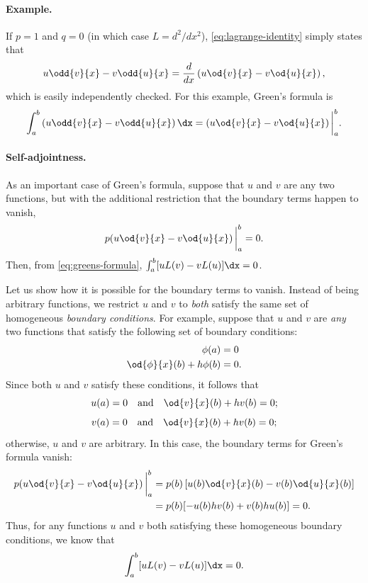 \paragraph{Example.}
If $p = 1$ and $q = 0$ (in which case $L = d^2/dx^2$), \eqref{eq:lagrange-identity} simply states that
\[
u\odd{v}{x} - v\odd{u}{x} = \frac{d}{d x}\left(u\od{v}{x} - v\od{u}{x}\right),
\]
which is easily independently checked.  For this example, Green's formula is
\[
\int_a^b \left(u\odd{v}{x} - v\odd{u}{x}\right)\dx = \left(u\od{v}{x} - v\od{u}{x}\right)\bigg|_a^b.
\]

\paragraph{Self-adjointness.}
As an important case of Green's formula, suppose that $u$ and $v$ are any two functions, but with the additional restriction that the boundary terms happen to vanish,
\[
p\!\left(u\od{v}{x} - v\od{u}{x}\right)\bigg|_a^b = 0.
\]
Then, from \eqref{eq:greens-formula}, $\int_a^b [uL(v) - vL(u)]\dx = 0$.

Let us show how it is possible for the boundary terms to vanish.  Instead of being arbitrary functions, we restrict $u$ and $v$ to \textit{both} satisfy the same set of homogeneous \textit{boundary conditions}.  For example, suppose that $u$ and $v$ are \textit{any} two functions that satisfy the following set of boundary conditions:
\begin{align*}
\phi(a) &= 0 \\
\od{\phi}{x}(b) + h\phi(b) &= 0.
\end{align*}
Since both $u$ and $v$ satisfy these conditions, it follows that
\[
u(a) = 0 \quad \text{and} \quad \od{v}{x}(b) + hv(b) = 0;
\]
\[
v(a) = 0 \quad \text{and} \quad \od{v}{x}(b) + hv(b) = 0;
\]
otherwise, $u$ and $v$ are arbitrary.  In this case, the boundary terms for Green's formula vanish:
\begin{align*}
p\!\left(u\od{v}{x} - v\od{u}{x}\right)\bigg|_a^b &= p(b)\left[u(b)\od{v}{x}(b) - v(b)\od{u}{x}(b)\right] \\
&= p(b)[-u(b)hv(b) + v(b)hu(b)] = 0.
\end{align*}
Thus, for any functions $u$ and $v$ both satisfying these homogeneous boundary conditions, we know that
\[
\int_a^b [uL(v) - vL(u)]\dx = 0.
\]

